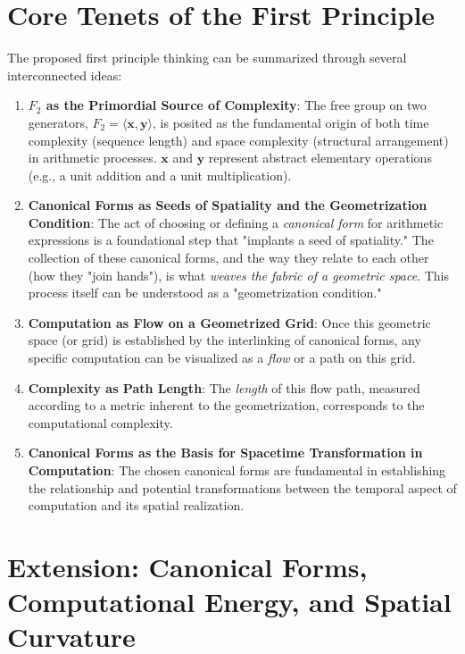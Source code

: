 \documentclass[12pt, a4paper]{article}
\theoremstyle{definition}
\begin{document}
\section{Core Tenets of the First Principle}

The proposed first principle thinking can be summarized through several interconnected ideas:

\begin{enumerate}
    \item \textbf{$F_2$ as the Primordial Source of Complexity}: The free group on two generators, $F_2 = \langle \mathbf{x}, \mathbf{y} \rangle$, is posited as the fundamental origin of both time complexity (sequence length) and space complexity (structural arrangement) in arithmetic processes. $\mathbf{x}$ and $\mathbf{y}$ represent abstract elementary operations (e.g., a unit addition and a unit multiplication).
    \item \textbf{Canonical Forms as Seeds of Spatiality and the Geometrization Condition}: The act of choosing or defining a \textit{canonical form} for arithmetic expressions is a foundational step that "implants a seed of spatiality." The collection of these canonical forms, and the way they relate to each other (how they "join hands"), is what \textit{weaves the fabric of a geometric space}. This process itself can be understood as a "geometrization condition."
    \item \textbf{Computation as Flow on a Geometrized Grid}: Once this geometric space (or grid) is established by the interlinking of canonical forms, any specific computation can be visualized as a \textit{flow} or a path on this grid.
    \item \textbf{Complexity as Path Length}: The \textit{length} of this flow path, measured according to a metric inherent to the geometrization, corresponds to the computational complexity.
    \item \textbf{Canonical Forms as the Basis for Spacetime Transformation in Computation}: The chosen canonical forms are fundamental in establishing the relationship and potential transformations between the temporal aspect of computation and its spatial realization.
\end{enumerate}

\section{Extension: Canonical Forms, Computational Energy, and Spatial Curvature}
\end{document}
